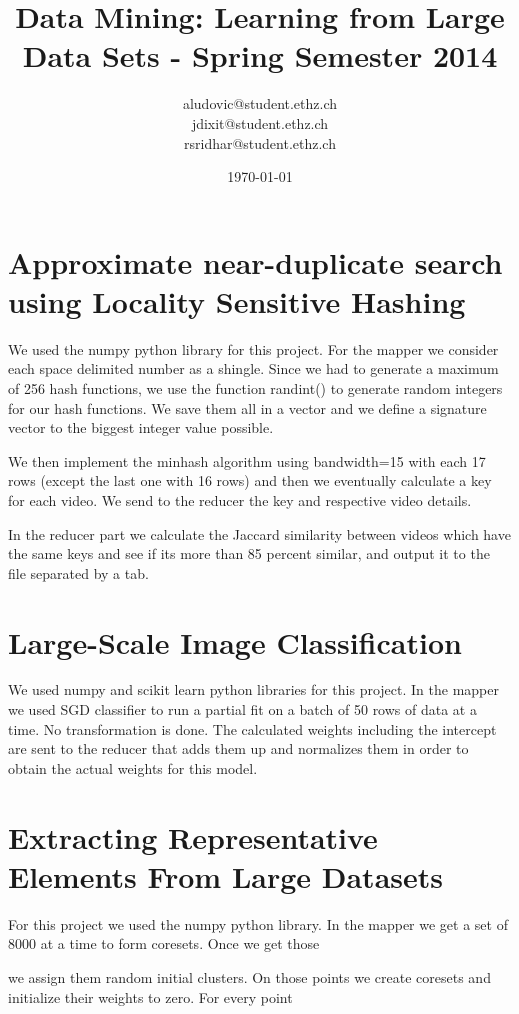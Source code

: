 \documentclass[a4paper, 11pt]{article}
\title{Data Mining: Learning from Large Data Sets - Spring Semester 2014}
\author{aludovic@student.ethz.ch\\ jdixit@student.ethz.ch\\ rsridhar@student.ethz.ch\\}
\date{\today}
\begin{document}
\maketitle

\section{Approximate near-duplicate search using Locality Sensitive Hashing} 

We used the numpy python library for this project. For the mapper we consider each space delimited number as a shingle. Since we had to generate a maximum
of 256 hash functions, we use the function randint() to generate random integers for our hash functions. We save them all in a vector and we define a signature
vector to the biggest integer value possible.

We then implement the minhash algorithm using bandwidth=15 with each 17 rows (except the last one with 16 rows) and then we eventually calculate a key for
each video. We send to the reducer the key and respective video details.

In the reducer part we calculate the Jaccard similarity between videos which have the same keys and see if its more than 85 percent similar, and output
it to the file separated by a tab.

\section{Large-Scale Image Classification}

We used numpy and scikit learn python libraries for this project. In the mapper we used SGD classifier to run a partial fit on a batch of 50 rows of data
at a time. No transformation is done. The calculated weights including the intercept are sent to the reducer that adds them up and normalizes them in order
to obtain the actual weights for this model.

\section{Extracting Representative Elements From Large Datasets}

For this project we used the numpy python library. In the mapper we get a set of 8000 at a time to form coresets. Once we get those

we assign them random initial clusters. On those points we create coresets and initialize their weights to zero. For every point
\end{document}
